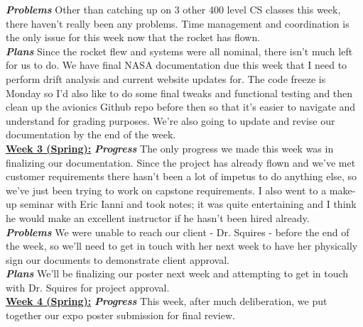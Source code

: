 \documentclass[onecolumn, draftclsnofoot, 10pt, compsoc]{IEEEtran}
\begin{document}
\textbf{\textit{{Problems}}}
\newline Other than catching up on 3 other 400 level CS classes this week, there haven't really been any problems. Time management and coordination is the only issue for this week now that the rocket has flown. \\

\textbf{\textit{{Plans}}}
\newline Since the rocket flew and systems were all nominal, there isn't much left for us to do. We have final NASA documentation due this week that I need to perform drift analysis and current website updates for. The code freeze is Monday so I'd also like to do some final tweaks and functional testing and then clean up the avionics Github repo before then so that it's easier to navigate and understand for grading purposes. We're also going to update and revise our documentation by the end of the week. \\

\underline{\textbf{Week 3 (Spring):}}
\newline\textbf{\textit{{Progress}}}
\newline The only progress we made this week was in finalizing our documentation. Since the project has already flown and we've met customer requirements there hasn't been a lot of impetus to do anything else, so we've just been trying to work on capstone requirements. I also went to a make-up seminar with Eric Ianni and took notes; it was quite entertaining and I think he would make an excellent instructor if he hasn't been hired already. \\

\textbf{\textit{{Problems}}}
\newline We were unable to reach our client - Dr. Squires - before the end of the week, so we'll need to get in touch with her next week to have her physically sign our documents to demonstrate client approval. \\

\textbf{\textit{{Plans}}}
\newline We'll be finalizing our poster next week and attempting to get in touch with Dr. Squires for project approval. \\

\underline{\textbf{Week 4 (Spring):}}
\newline\textbf{\textit{{Progress}}}
\newline This week, after much deliberation, we put together our expo poster submission for final review. \\
\end{document}
